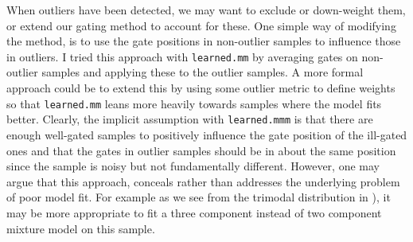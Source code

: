 When outliers have been detected, we may want to exclude or down-weight them, or extend our gating method to account for these.
One simple way of modifying the method, is to use the gate positions in non-outlier samples to influence those in outliers.
I tried this approach with \texttt{learned.mm} by averaging gates on non-outlier samples and applying these to the outlier samples.
A more formal approach could be to extend this by using some outlier metric to define weights so that \texttt{learned.mm} leans more heavily
towards samples where the model fits better.
Clearly, the implicit assumption with \texttt{learned.mmm} is that there are enough well-gated samples to positively influence the gate position of the ill-gated ones
and that the gates in outlier samples should be in about the same position since the sample is noisy but not fundamentally different.
However, one may argue that this approach, conceals rather than addresses the underlying problem of poor model fit.
For example as we see from the trimodal distribution in ), it may be more appropriate to fit a three component instead
of two component mixture model on this sample.


